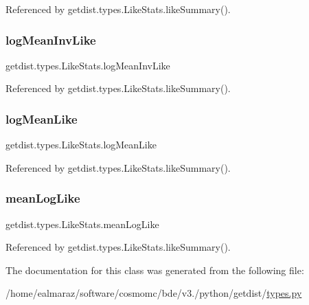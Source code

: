 Referenced by getdist.\+types.\+Like\+Stats.\+like\+Summary().

\mbox{\label{classgetdist_1_1types_1_1LikeStats_ad9fc26e7f4bd3acb6a0a48bd22da0199}} 
\subsubsection{\texorpdfstring{log\+Mean\+Inv\+Like}{logMeanInvLike}}
{\footnotesize\ttfamily getdist.\+types.\+Like\+Stats.\+log\+Mean\+Inv\+Like}



Referenced by getdist.\+types.\+Like\+Stats.\+like\+Summary().

\mbox{\label{classgetdist_1_1types_1_1LikeStats_a1a313f75f9bed09e15629197724050bd}} 
\subsubsection{\texorpdfstring{log\+Mean\+Like}{logMeanLike}}
{\footnotesize\ttfamily getdist.\+types.\+Like\+Stats.\+log\+Mean\+Like}



Referenced by getdist.\+types.\+Like\+Stats.\+like\+Summary().

\mbox{\label{classgetdist_1_1types_1_1LikeStats_a8f32c4b3a7dd7ff655d7e0ba28df8528}} 
\subsubsection{\texorpdfstring{mean\+Log\+Like}{meanLogLike}}
{\footnotesize\ttfamily getdist.\+types.\+Like\+Stats.\+mean\+Log\+Like}



Referenced by getdist.\+types.\+Like\+Stats.\+like\+Summary().



The documentation for this class was generated from the following file\+:\begin{DoxyCompactItemize}
\item 
/home/ealmaraz/software/cosmomc/bde/v3./python/getdist/\mbox{\hyperlink{types_8py}{types.\+py}}\end{DoxyCompactItemize}
